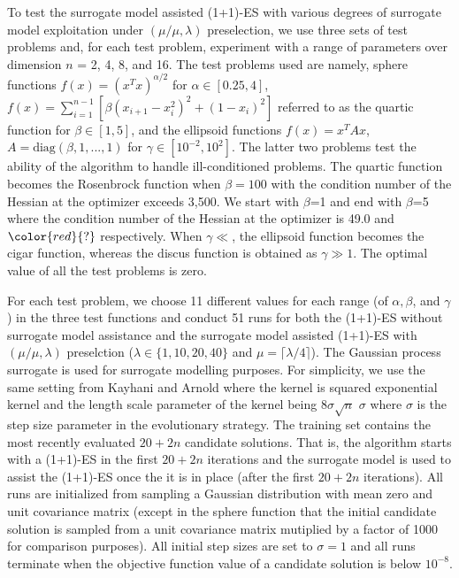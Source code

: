 To test the surrogate model assisted (1+1)-ES with various degrees of surrogate model exploitation under $(\mu/\mu,\lambda)$ preselection, we use three sets of test problems and, for each test problem, experiment with a range of parameters over dimension $n$ = 2, 4, 8, and 16. The test problems used are namely, sphere functions $f(x) = (x^Tx)^{\alpha/2}$ for $\alpha \in [0.25,4]$, $f(x) = \sum_{i=1}^{n-1}[\beta (x_{i+1} - x_i^2)^2 + (1-x_i)^2]$ referred to as the quartic function for $\beta \in [1,5]$, and the ellipsoid functions $f(x)=x^TAx$, $A=\text{diag}(\beta,1,...,1)$ for $\gamma \in [10^{-2},10^2] $. The latter two problems test the ability of the algorithm to handle ill-conditioned problems. The quartic function becomes the Rosenbrock function when $\beta = 100$ with the condition number of the Hessian at the optimizer exceeds 3,500. We start with $\beta$=1 and end with $\beta$=5 where the condition number of the Hessian at the optimizer is 49.0 and $\color{red}{?}$ respectively. When $\gamma \ll$, the ellipsoid function becomes the cigar function, whereas the discus function is obtained as $\gamma \gg 1$. The optimal value of all the test problems is zero. 

For each test problem, we choose 11 different values for each range (of $\alpha,\beta$, and $\gamma$) in the three test functions and conduct 51 runs for both the (1+1)-ES without surrogate model assistance and the surrogate model assisted (1+1)-ES with $(\mu/\mu,\lambda)$ preselction ($\lambda \in \{1,10,20,40\}$ and $\mu = \lceil \lambda/4 \rceil$). The Gaussian process surrogate is used for surrogate modelling purposes. For simplicity, we use the same  setting from Kayhani and Arnold \cite{} where the kernel is squared exponential kernel and the length scale parameter of the kernel being $8 \sigma \sqrt{n}$ $\sigma$ where $\sigma$ is the step size parameter in the evolutionary strategy. The training set contains the most recently evaluated $20+2n$ candidate solutions. That is, the algorithm starts with a (1+1)-ES in the first $20+2n$ iterations and the surrogate model is used to assist the (1+1)-ES once the it is in place (after the first $20+2n$ iterations). All runs are initialized from sampling a Gaussian distribution with mean zero and unit covariance matrix (except in the sphere function that the initial candidate solution is sampled from a unit covariance matrix mutiplied by a factor of 1000 for comparison purposes). All initial step sizes are set to $\sigma=1$ and all runs terminate when the objective function value of a candidate solution is below $10^{-8}$. 

